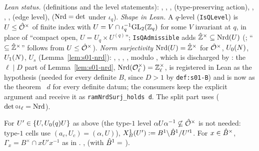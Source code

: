 \begin{sloppypar}\noindent\emph{Lean status.} \stformal{} (definitions and the level statements):
, , ,
 (type-preserving action), ,
, ,  (edge
level),  ($\mathrm{Nrd}=\det$ under $\iota_q$).
\emph{Shape in Lean.} A $q$-level (\texttt{IsQLevel}) is $U\le\hat{\mathcal{O}}^\times$ of finite index with $U=V\cap\iota_q^{-1}\mathrm{GL}_2(\mathbb{Z}_q)$ for
some $V$ invariant at $q$, in place of ``compact open, $U=U_q\times U^{(q)}$''; \texttt{IsQAdmissible} adds $\hat{\mathbb{Z}}^\times\subseteq\mathrm{Nrd}(U)$
(; ``$\subseteq\hat{\mathbb{Z}}^\times$'' follows from $U\le\hat{\mathcal{O}}^\times$).
\emph{Norm surjectivity} $\mathrm{Nrd}(U)=\hat{\mathbb{Z}}^\times$ for $\hat{\mathcal{O}}^\times$, $U_0(N)$, $U_1(N)$, $U_s$ (Lemma~\ref{lem:s01-nrd}):
, , ,
, \stformal{} modulo , which is discharged by
: the $\ell\mid D$ part of Lemma~\ref{lem:s01-nrd},
$\mathrm{Nrd}(\mathcal{O}_\ell^\times)=\mathbb{Z}_\ell^\times$, is registered in Lean as the hypothesis 
(needed for every definite $B$, since $D>1$ by \texttt{def:s01-B}) and is now \stformal{} as the theorem
~$d$ for every definite datum; the consumers keep the explicit argument and receive it as
\texttt{ramNrdSurj\_holds d}. The split part uses
 ($\det\circ\iota_\ell=\mathrm{Nrd}$).\end{sloppypar}

\begin{definition}\label{def:s02-Xone}
For $U'\in\{U,U_0(q)U\}$ as above (the type-$1$ level $\alpha U\alpha^{-1}\not\subseteq\hat{\mathcal{O}}^\times$ is not needed: type-$1$ cells use $(a_c,U_c)=(\alpha,U)$), $X^1_B(U'):=B^1\backslash\hat{B}^1/U'^1$. For $x\in\hat{B}^\times$, $\Gamma_x=B^\times\cap xU'x^{-1}$
as in . \stformal{} , 
(with $\hat{B}^1=$ ).
\end{definition}

